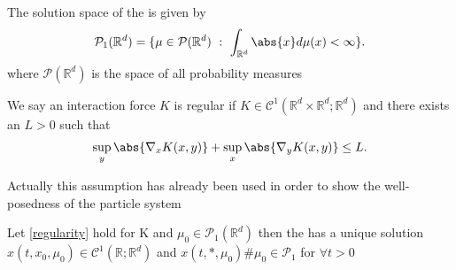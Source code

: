 \begin{remark}
  The solution space  of the  is  given by 
  \begin{align*}
    \mathcal{P}_1(\mathbb{R}^{d} ) = \{\mu \in \mathcal{P}(\mathbb{R}^{d} ) \ : \ \int_{\mathbb{R}^{d} } \abs{x} d \mu(x) <\infty\}  
  .\end{align*}
  where $\mathcal{P}(\mathbb{R}^{d} )$ is the space of all probability measures
\end{remark}
\begin{assumption}[Regularity]\label{regularity}
 We say an interaction force $K$ is regular if $K \in  \mathcal{C}^{1}(\mathbb{R}^{d} \times  \mathbb{R}^{d} ; \mathbb{R}^{d}   ) $ and there exists
 an $L > 0$ such that 
 \begin{align*}
   \sup_{y} \abs{\nabla_x K(x,y)} + \sup_{x} \abs{\nabla_y K(x,y)} \le L
 .\end{align*}
\end{assumption}
Actually this assumption has already been used in order to show the well-posedness of the particle system
\newpage
\begin{theorem}\label{existence_uniqueness_char}
  Let \autoref{regularity} hold for K and $\mu_0 \in \mathcal{P}_1(\mathbb{R}^{d} )$ then the 
    has a unique solution $x(t,x_{0},\mu_0) \in  \mathcal{C}^{1}(\mathbb{R};\mathbb{R}^{d}  ) $
  and $x(t,*,\mu_0) \# \mu_0 \in  \mathcal{P}_1 $ for $\forall t > 0$
\end{theorem}
